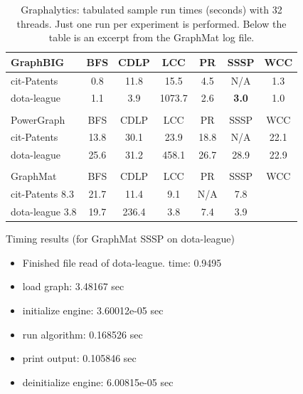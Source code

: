 \documentclass[conference]{IEEEtran}
\begin{document}
\begin{table}
	\caption{Graphalytics: tabulated sample run times (seconds) with 32 threads. Just one run per experiment is performed. Below the table is an excerpt from the GraphMat log file.}
		\label{tab:graphalytics-realworld}
	\vspace{-10pt}
	\begin{center}
	\begin{tabular}{l|c|c|c|c|c|c}
	GraphBIG & BFS  & CDLP  &   LCC   &  PR &  SSSP & WCC \\ \hline
	cit-Patents & 0.8 & 11.8 & 15.5  &  4.5 & N/A  & 1.3 \\
	dota-league & 1.1 & 3.9 & 1073.7 &  2.6 & \textbf{3.0} & 1.0 \\
	\multicolumn{1}{l}{}\\
	PowerGraph & BFS  & CDLP  &   LCC   &  PR &  SSSP & WCC \\ \hline
	cit-Patents & 13.8 & 30.1 & 23.9 & 18.8 & N/A & 22.1 \\
	dota-league & 25.6 & 31.2 & 458.1 & 26.7 & 28.9 & 22.9 \\
	\multicolumn{1}{l}{}\\
	GraphMat & BFS  & CDLP  &   LCC   &  PR &  SSSP & WCC \\ \hline
	cit-Patents 8.3 & 21.7 & 11.4 & 9.1 & N/A & 7.8 \\
	dota-league 3.8 & 19.7 & 236.4 & 3.8 & 7.4 & 3.9 \\
	\end{tabular}
	\end{center}
\noindent Timing results (for GraphMat SSSP on dota-league)
	\begin{itemize}
		\item Finished file read of dota-league. time: 0.9495
		\item load graph: 3.48167 sec
		\item initialize engine: 3.60012e-05 sec
		\item run algorithm: 0.168526 sec
		\item print output: 0.105846 sec
		\item deinitialize engine: 6.00815e-05 sec
	\end{itemize}
\end{table}
\end{document}
